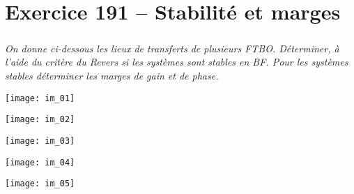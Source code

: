 \section*{Exercice 191 -- Stabilité et marges}
\setcounter{exo}{0}

\subparagraph{}\textit{On donne ci-dessous les lieux de transferts de plusieurs  FTBO. Déterminer, à l’aide du critère du Revers si les systèmes sont stables en BF. Pour les systèmes stables déterminer les marges de gain et de phase.}
 
 
\begin{center}
\texttt{[image: im\_01]}
\end{center}

\begin{center}
\texttt{[image: im\_02]}
\end{center}

\begin{center}
\texttt{[image: im\_03]}
\end{center}

\begin{center}
\texttt{[image: im\_04]}
\end{center}

\begin{center}
\texttt{[image: im\_05]}
\end{center}





